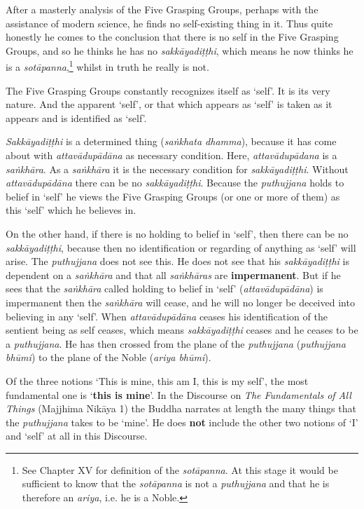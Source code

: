 After a masterly analysis of the Five Grasping Groups, perhaps with the assistance of modern science, he finds no self-existing thing in it. Thus quite honestly he comes to the conclusion that there is no self in the Five Grasping Groups, and so he thinks he has no \emph{sakkāyadiṭṭhi}, which means he now thinks he is a \emph{sotāpanna},\footnote{See Chapter XV for definition of the \emph{sotāpanna}. At this stage it would be sufficient to know that the \emph{sotāpanna} is not a \emph{puthujjana} and that he is therefore an \emph{ariya}, i.e. he is a Noble.} whilst in truth he really is not.

The Five Grasping Groups constantly recognizes itself as `self'. It is its very nature. And the apparent `self', or that which appears as `self' is taken as it appears and is identified as `self'.

\emph{Sakkāyadiṭṭhi} is a determined thing (\emph{saṅkhata dhamma}), because it has come about with \emph{attavādupādāna} as necessary condition. Here, \emph{attavādupādana} is a \emph{saṅkhāra}. As a \emph{saṅkhāra} it is the necessary condition for \emph{sakkāyadiṭṭhi}. Without \emph{attavādupādāna} there can be no \emph{sakkāyadiṭṭhi}. Because the \emph{puthujjana} holds to belief in `self' he views the Five Grasping Groups (or one or more of them) as this `self' which he believes in.

On the other hand, if there is no holding to belief in `self', then there can be no \emph{sakkāyadiṭṭhi}, because then no identification or regarding of anything as `self' will arise. The \emph{puthujjana} does not see this. He does not see that his \emph{sakkāyadiṭṭhi} is dependent on a \emph{saṅkhāra} and that all \emph{saṅkhāras} are \textbf{impermanent}. But if he sees that the \emph{saṅkhāra} called holding to belief in `self' (\emph{attavādupādāna}) is impermanent then the \emph{saṅkhāra} will cease, and he will no longer be deceived into believing in any `self'. When \emph{attavādupādāna} ceases his identification of the sentient being as self ceases, which means \emph{sakkāyadiṭṭhi} ceases and he ceases to be a \emph{puthujjana}. He has then crossed from the plane of the \emph{puthujjana} (\emph{puthujjana bhūmi}) to the plane of the Noble (\emph{ariya bhūmi}).

Of the three notions `This is mine, this am I, this is my self', the most fundamental one is `\textbf{this is mine}'. In the Discourse on \emph{The Fundamentals of All Things} (Majjhima Nikāya 1) the Buddha narrates at length the many things that the \emph{puthujjana} takes to be `mine'. He does \textbf{not} include the other two notions of `I' and `self' at all in this Discourse.

